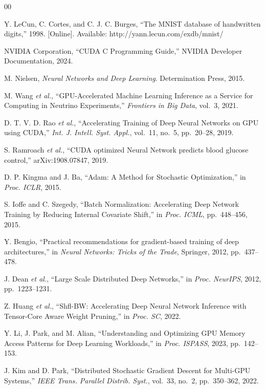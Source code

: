 \documentclass[conference]{IEEEtran}
\begin{document}
\begin{thebibliography}{00}

 Y. LeCun, C. Cortes, and C. J. C. Burges, ``The MNIST database of handwritten digits,'' 1998. [Online]. Available: http://yann.lecun.com/exdb/mnist/

 NVIDIA Corporation, ``CUDA C Programming Guide,'' NVIDIA Developer Documentation, 2024.

 M. Nielsen, \textit{Neural Networks and Deep Learning}. Determination Press, 2015.

 M. Wang \textit{et al.}, ``GPU-Accelerated Machine Learning Inference as a Service for Computing in Neutrino Experiments,'' \textit{Frontiers in Big Data}, vol.~3, 2021.

 D. T. V. D. Rao \textit{et al.}, ``Accelerating Training of Deep Neural Networks on GPU using CUDA,'' \textit{Int. J. Intell. Syst. Appl.}, vol.~11, no.~5, pp.~20--28, 2019.

 S. Ramroach \textit{et al.}, ``CUDA optimized Neural Network predicts blood glucose control,'' arXiv:1908.07847, 2019.

 D. P. Kingma and J. Ba, ``Adam: A Method for Stochastic Optimization,'' in \textit{Proc. ICLR}, 2015.

 S. Ioffe and C. Szegedy, ``Batch Normalization: Accelerating Deep Network Training by Reducing Internal Covariate Shift,'' in \textit{Proc. ICML}, pp.~448--456, 2015.

 Y. Bengio, ``Practical recommendations for gradient-based training of deep architectures,'' in \textit{Neural Networks: Tricks of the Trade}, Springer, 2012, pp.~437--478.

 J. Dean \textit{et al.}, ``Large Scale Distributed Deep Networks,'' in \textit{Proc. NeurIPS}, 2012, pp.~1223--1231.

 Z. Huang \textit{et al.}, ``Shfl-BW: Accelerating Deep Neural Network Inference with Tensor-Core Aware Weight Pruning,'' in \textit{Proc. SC}, 2022.

 Y. Li, J. Park, and M. Alian, ``Understanding and Optimizing GPU Memory Access Patterns for Deep Learning Workloads,'' in \textit{Proc. ISPASS}, 2023, pp.~142--153.

 J. Kim and D. Park, ``Distributed Stochastic Gradient Descent for Multi-GPU Systems,'' \textit{IEEE Trans. Parallel Distrib. Syst.}, vol.~33, no.~2, pp.~350--362, 2022.


\end{thebibliography}
\end{document}
